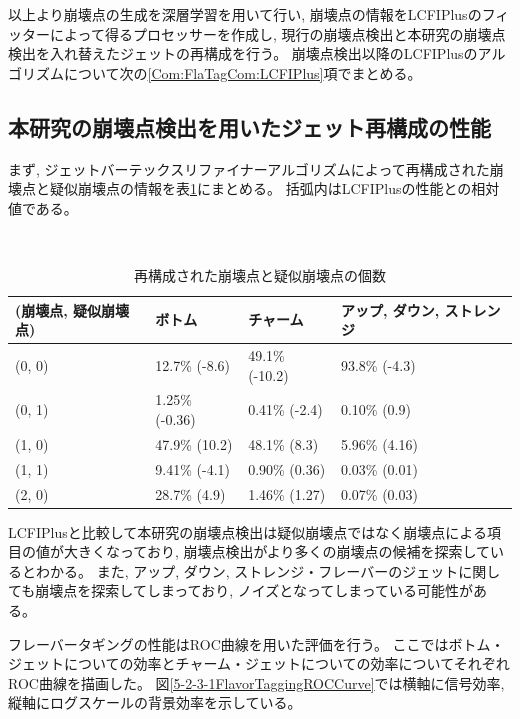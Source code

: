 以上より崩壊点の生成を深層学習を用いて行い, 崩壊点の情報をLCFIPlusのフィッターによって得るプロセッサーを作成し, 現行の崩壊点検出と本研究の崩壊点検出を入れ替えたジェットの再構成を行う。
崩壊点検出以降のLCFIPlusのアルゴリズムについて次の\ref{Com:FlaTagCom:LCFIPlus}項でまとめる。


\subsection{本研究の崩壊点検出を用いたジェット再構成の性能} \label{Com:FlaTagCom:PerformanceofFlavorTagging}

まず, ジェットバーテックスリファイナーアルゴリズムによって再構成された崩壊点と疑似崩壊点の情報を表\ref{TheNumberofReconstructedVertices}にまとめる。
括弧内はLCFIPlusの性能との相対値である。

\begin{table}[htb]
 \centering
　\small
  \begin{tabular}{l l l l}\hline
    (崩壊点, 疑似崩壊点) & ボトム & チャーム & アップ, ダウン, ストレンジ\\\hline\hline
    (0, 0) & 12.7\% (-8.6) & 49.1\% (-10.2) & 93.8\% (-4.3)\\
    (0, 1) & 1.25\% (-0.36) & 0.41\% (-2.4) & 0.10\% (0.9)\\
    (1, 0) & 47.9\% (10.2) & 48.1\% (8.3) & 5.96\% (4.16)\\
    (1, 1) & 9.41\% (-4.1) & 0.90\% (0.36) & 0.03\% (0.01)\\
    (2, 0) & 28.7\% (4.9) & 1.46\% (1.27) & 0.07\% (0.03)\\\hline
  \end{tabular}
  \caption{再構成された崩壊点と疑似崩壊点の個数}
  \label{TheNumberofReconstructedVertices}
\end{table}

LCFIPlusと比較して本研究の崩壊点検出は疑似崩壊点ではなく崩壊点による項目の値が大きくなっており, 崩壊点検出がより多くの崩壊点の候補を探索しているとわかる。
また, アップ, ダウン, ストレンジ・フレーバーのジェットに関しても崩壊点を探索してしまっており, ノイズとなってしまっている可能性がある。

フレーバータギングの性能はROC曲線を用いた評価を行う。
ここではボトム・ジェットについての効率とチャーム・ジェットについての効率についてそれぞれROC曲線を描画した。
図\ref{5-2-3-1FlavorTaggingROCCurve}では横軸に信号効率, 縦軸にログスケールの背景効率を示している。

